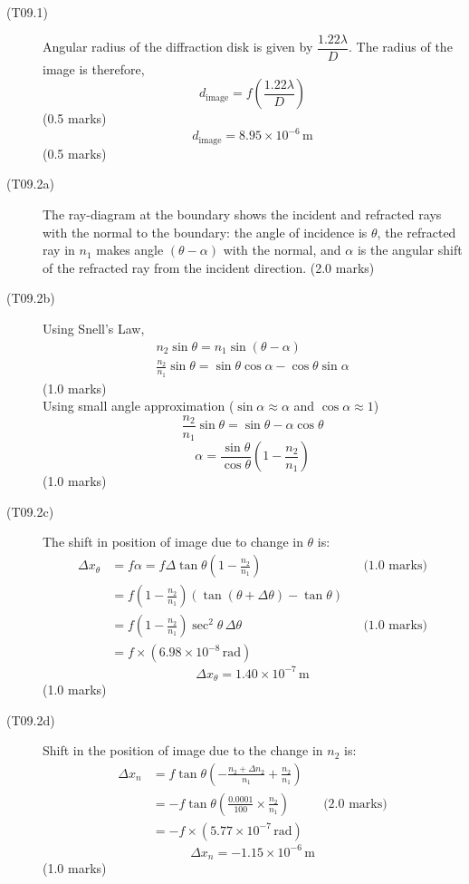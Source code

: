 \begin{description}
\item[(T09.1)]
Angular radius of the diffraction disk is given by
$\dfrac{1.22\lambda}{D}$. The radius of the image is therefore,
\[ d_{\mathrm{image}} = f\left(\frac{1.22\lambda}{D}\right) \]
\hfill(0.5 marks)
\[ d_{\mathrm{image}} = 8.95 \times 10^{-6}\,\mathrm{m} \]
\hfill(0.5 marks)

\item[(T09.2a)]
The ray-diagram at the boundary shows the incident and refracted rays with
the normal to the boundary: the angle of incidence is $\theta$, the
refracted ray in $n_1$ makes angle $(\theta - \alpha)$ with the normal, and
$\alpha$ is the angular shift of the refracted ray from the incident
direction. \hfill(2.0 marks)

\item[(T09.2b)]
Using Snell's Law,
\begin{gather*}
n_2\sin\theta = n_1\sin(\theta - \alpha) \\
\frac{n_2}{n_1}\sin\theta = \sin\theta\cos\alpha - \cos\theta\sin\alpha
\end{gather*}
\hfill(1.0 marks)\\
Using small angle approximation ($\sin\alpha \approx \alpha$ and
$\cos\alpha \approx 1$)
\[ \frac{n_2}{n_1}\sin\theta = \sin\theta - \alpha\cos\theta \]
\[ \alpha = \frac{\sin\theta}{\cos\theta}\left(1 - \frac{n_2}{n_1}\right) \]
\hfill(1.0 marks)

\item[(T09.2c)]
The shift in position of image due to change in $\theta$ is:
\begin{align*}
\Delta x_\theta &= f\alpha
  = f\Delta\tan\theta\left(1 - \frac{n_2}{n_1}\right)
  && \text{(1.0 marks)} \\
  &= f\left(1 - \frac{n_2}{n_1}\right)
     (\tan(\theta + \Delta\theta) - \tan\theta) \\
  &= f\left(1 - \frac{n_2}{n_1}\right)\sec^2\theta\,\Delta\theta
  && \text{(1.0 marks)} \\
  &= f \times (6.98 \times 10^{-8}\,\mathrm{rad})
\end{align*}
\[ \Delta x_\theta = 1.40 \times 10^{-7}\,\mathrm{m} \]
\hfill(1.0 marks)

\item[(T09.2d)]
Shift in the position of image due to the change in $n_2$ is:
\begin{align*}
\Delta x_n &= f\tan\theta
  \left(-\frac{n_2 + \Delta n_2}{n_1} + \frac{n_2}{n_1}\right) \\
  &= -f\tan\theta\left(\frac{0.0001}{100} \times \frac{n_2}{n_1}\right)
  && \text{(2.0 marks)} \\
  &= -f \times (5.77 \times 10^{-7}\,\mathrm{rad})
\end{align*}
\[ \Delta x_n = -1.15 \times 10^{-6}\,\mathrm{m} \]
\hfill(1.0 marks)


\end{description}
